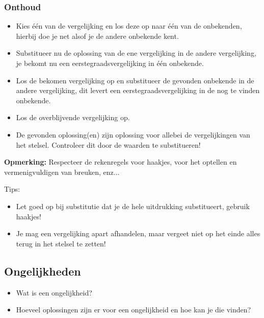 \subsubsection{Onthoud}

\begin{framed}
\begin{itemize}
\item Kies \'{e}\'{e}n van de vergelijking en los deze op naar \'{e}\'{e}n van de onbekenden, hierbij doe je net alsof je de andere onbekende kent.
\item Substitueer nu de oplossing van de ene vergelijking in de andere vergelijking, je bekomt nu een eerstegraadsvergelijking in \'{e}\'{e}n onbekende.
\item Los de bekomen vergelijking op en substitueer de gevonden onbekende in de andere vergelijking, dit levert een eerstegraadsvergelijking in de nog te vinden onbekende.
\item Los de overblijvende vergelijking op.
\item De gevonden oplossing(en) zijn oplossing voor allebei de vergelijkingen van het stelsel. Controleer dit door de waarden te substitueren!
\end{itemize}

{\bf Opmerking:} Respecteer de rekenregels voor haakjes, voor het optellen en vermenigvuldigen van breuken, enz...\\
\end{framed}

Tips:
\begin{framed}
\begin{itemize}
	\item Let goed op bij substitutie dat je de hele uitdrukking substitueert, gebruik haakjes!
	\item Je mag een vergelijking apart afhandelen, maar vergeet niet op het einde alles terug in het stelsel te zetten!
\end{itemize}
\end{framed}

\subsection{Ongelijkheden}

\begin{itemize}
\item Wat is een ongelijkheid?
\item Hoeveel oplossingen zijn er voor een ongelijkheid en hoe kan je die vinden?
\end{itemize}


